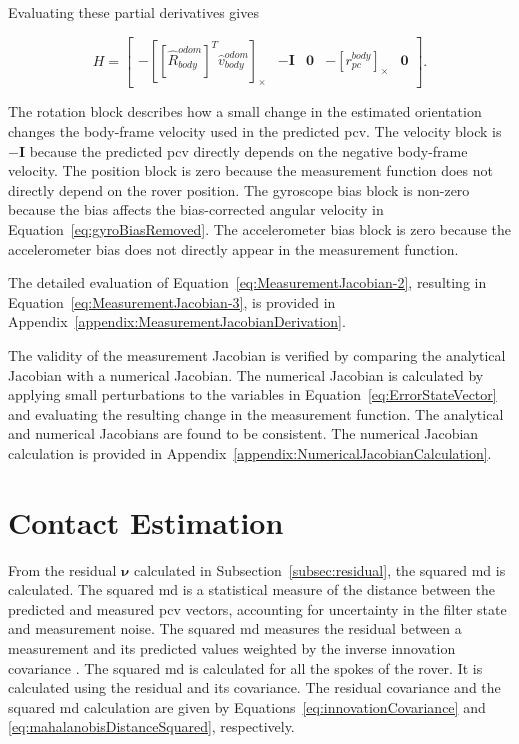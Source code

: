 \documentclass[report.tex]{subfiles}
\begin{document}
    Evaluating these partial derivatives gives

    \begin{equation}
        H
        =
        \begin{bmatrix}
            -\left[
                [\hat{R}_{body}^{odom}]^{T}
                \hat{v}_{body}^{odom}
            \right]_{\times}
            &
            -\mathbf{I}
            &
            \mathbf{0}
            &
            -[r_{pc}^{body}]_{\times}
            &
            \mathbf{0}
        \end{bmatrix}.
        \label{eq:MeasurementJacobian-3}
    \end{equation}

    The rotation block describes how a small change in the estimated orientation changes the body-frame velocity used in the predicted \gls{pcv}. The velocity block is $-\mathbf{I}$ because the predicted \gls{pcv} directly depends on the negative body-frame velocity. The position block is zero because the measurement function does not directly depend on the rover position. The gyroscope bias block is non-zero because the bias affects the bias-corrected angular velocity in Equation~\ref{eq:gyroBiasRemoved}. The accelerometer bias block is zero because the accelerometer bias does not directly appear in the measurement function.

    The detailed evaluation of Equation~\ref{eq:MeasurementJacobian-2}, resulting in Equation~\ref{eq:MeasurementJacobian-3}, is provided in Appendix~\ref{appendix:MeasurementJacobianDerivation}.

    The validity of the measurement Jacobian is verified by comparing the analytical Jacobian with a numerical Jacobian. The numerical Jacobian is calculated by applying small perturbations to the variables in Equation~\ref{eq:ErrorStateVector} and evaluating the resulting change in the measurement function. The analytical and numerical Jacobians are found to be consistent. The numerical Jacobian calculation is provided in Appendix~\ref{appendix:NumericalJacobianCalculation}.

    \section{Contact Estimation} \label{sec:ContactEstimation}
            
        From the residual $\boldsymbol{\nu}$ calculated in Subsection~\ref{subsec:residual}, the squared \gls{md} is calculated. The squared \gls{md} is a statistical measure of the distance between the predicted and measured \gls{pcv} vectors, accounting for uncertainty in the filter state and measurement noise. The squared \gls{md} measures the residual between a measurement and its predicted values weighted by the inverse innovation covariance \cite{SITE-mathworks-mahalanobis}. The squared \gls{md} is calculated for all the spokes of the rover. It is calculated using the residual and its covariance. The residual covariance and the squared \gls{md} calculation are given by Equations~\ref{eq:innovationCovariance} and \ref{eq:mahalanobisDistanceSquared}, respectively.
        
\end{document}
